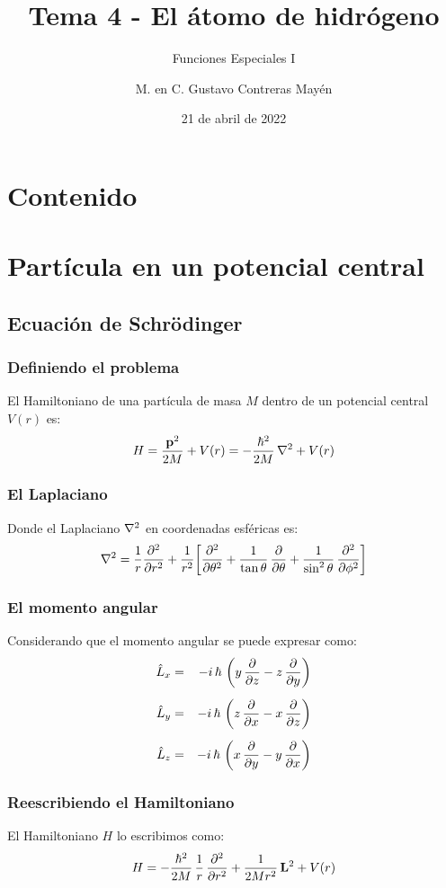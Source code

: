 \documentclass[12pt]{beamer}
\date{21 de abril de 2022}
\title{\large{Tema 4 - El átomo de hidrógeno}}
\subtitle{Funciones Especiales I}
\author{M. en C. Gustavo Contreras Mayén}
\begin{document}
\maketitle
\fontsize{14}{14}\selectfont
{}

\section*{Contenido}


\section{Partícula en un potencial central}
\subsection{Ecuación de Schrödinger}


\begin{frame}
\frametitle{Definiendo el problema}
El Hamiltoniano de una partícula de masa $M$ dentro de un potencial central $V (r)$ es:
\pause
\begin{align}
H = \dfrac{\vb{p}^{2}}{2 M} + V (r) = - \dfrac{\hbar^{2}}{2 M} \, \laplacian + V (r)
\label{eq:ecuacion_08_01}
\end{align}
\end{frame}
\begin{frame}
\frametitle{El Laplaciano}
Donde el Laplaciano $\laplacian$ en coordenadas esféricas es:
\pause
\begin{align}
\laplacian = \dfrac{1}{r} \pdv[2]{r} + \dfrac{1}{r^{2}} \bigg[ \pdv[2]{\theta} + \dfrac{1}{\tan \theta} \, \pdv{\theta} + \dfrac{1}{\sin^{2} \theta} \, \pdv[2]{\phi} \bigg]
\label{eq:ecuacion_08_02}
\end{align}
\end{frame}
\begin{frame}
\frametitle{El momento angular}
Considerando que el momento angular se puede expresar como:
\pause
\begin{align}
\begin{aligned}
\hat{L}_{x} &=& - i \, \hbar \, \left( y \, \pdv{z} - z \, \pdv{y} \right) \\[0.5em] 
\hat{L}_{y} &=& - i \, \hbar \, \left( z \, \pdv{x} - x \, \pdv{z} \right) \\[0.5em] 
\hat{L}_{z} &=& - i \, \hbar \, \left( x \, \pdv{y} - y \, \pdv{x} \right)
\end{aligned}
\label{eq:ecuacion_01_03a}
\end{align}
\end{frame}
\begin{frame}
\frametitle{Reescribiendo el Hamiltoniano}
El Hamiltoniano $H$ lo escribimos como:
\pause
\begin{align}
H = - \dfrac{\hbar^{2}}{2 M} \, \dfrac{1}{r} \, \pdv[2]{r} + \dfrac{1}{2 M r^{2}} \, \vb{L}^{2} + V (r)
\label{eq:ecuacion_08_03}
\end{align}
\end{frame}
\end{document}
